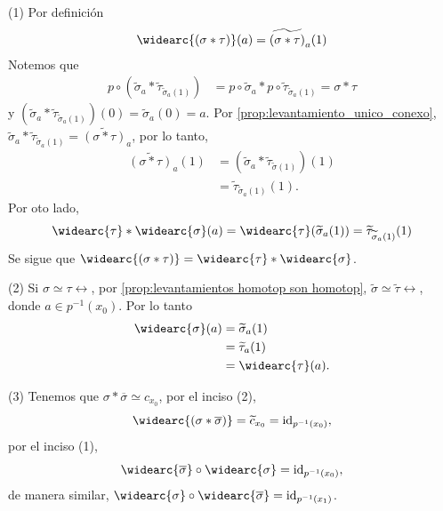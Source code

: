 \begin{dem}
    (1) Por definición
    \begin{align*}
        \widearc{(\sigma*\tau)}(a)=\widetilde{(\sigma*\tau)}_a(1)
    \end{align*}
    Notemos que
    \begin{align*}
        p\circ (\widetilde{\sigma}_a*\widetilde{\tau}_{\widetilde{\sigma}_a(1)})&=p\circ \widetilde{\sigma}_a*p\circ\widetilde{\tau}_{\widetilde{\sigma}_a(1)}=\sigma*\tau
    \end{align*}
    y $(\widetilde{\sigma}_a*\widetilde{\tau}_{\widetilde{\sigma}_a(1)})(0)=\widetilde{\sigma}_a(0)=a$. Por \ref{prop:levantamiento_unico_conexo}, $\widetilde{\sigma}_a*\widetilde{\tau}_{\widetilde{\sigma}_a(1)}=\widetilde{(\sigma*\tau)}_a$, por lo tanto,
    \begin{align*}
        \widetilde{(\sigma*\tau)}_a(1)&=(\widetilde{\sigma}_a*\widetilde{\tau}_{\widetilde{\sigma}(1)})(1)\\
        &=\widetilde{\tau}_{\widetilde{\sigma}_a(1)}(1).
    \end{align*}
    Por oto lado,
    \begin{align*}
        \widearc{\tau}*\widearc{\sigma}(a)= \widearc{\tau}(\widetilde{\sigma}_a(1))=\widetilde{\tau}_{\widetilde{\sigma}_a(1)}(1)
    \end{align*}
    Se sigue que $\widearc{(\sigma*\tau)}=\widearc{\tau}*\widearc{\sigma}$.

    (2) Si $\sigma\simeq\tau\rel$, por \ref{prop:levantamientos homotop son homotop}, $\widetilde{\sigma}\simeq\widetilde{\tau}\rel$, donde $a\in p^{-1}(x_0)$. Por lo tanto
    \begin{align*}
        \widearc{\sigma}(a)&=\widetilde{\sigma}_a(1)\\
        &=\widetilde{\tau}_a(1)\\
        &=\widearc{\tau}(a).
    \end{align*}

    (3) Tenemos que $\sigma*\overline{\sigma}\simeq c_{x_0}$, por el inciso (2), 
    \begin{equation*}
        \widearc{(\sigma*\overline{\sigma})}=\widetilde{c}_{x_0}=\id_{p^{-1}(x_0)},
    \end{equation*}
    por el inciso (1), 
    \begin{equation*}
        \widearc{\overline{\sigma}}\circ\widearc{\sigma}=\id_{p^{-1}(x_0)},
    \end{equation*}
    de manera similar, $\widearc{\sigma}\circ\widearc{\overline{\sigma}}=\id_{p^{-1}(x_1)}$.
\end{dem}
